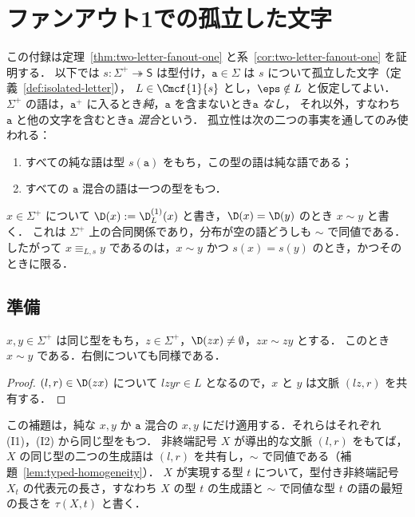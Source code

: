 \section{ファンアウト1での孤立した文字}
\label{app:two-letter-fanout-one}

この付録は定理~\ref{thm:two-letter-fanout-one} と系~\ref{cor:two-letter-fanout-one} を証明する．
以下では $s:\Sigma^+\twoheadrightarrow\mathsf S$ は型付け，$\mathtt a\in\Sigma$ は $s$ について孤立した文字（定義~\ref{def:isolated-letter}），
$L\in\Cmcf{1}{s}$ とし，$\eps\notin L$ と仮定してよい．
$\Sigma^+$ の語は，$\mathtt a^+$ に入るとき\emph{純}，$\mathtt a$ を含まないとき\emph{$\mathtt a$ なし}，
それ以外，すなわち $\mathtt a$ と他の文字を含むとき\emph{$\mathtt a$ 混合}という．
孤立性は次の二つの事実を通してのみ使われる：
\begin{enumerate}[label=\textup{(I\arabic*)},leftmargin=*]
\item すべての純な語は型 $s(\mathtt a)$ をもち，この型の語は純な語である；
\item すべての $\mathtt a$ 混合の語は一つの型をもつ．
\end{enumerate}
$x\in\Sigma^+$ について $\D(x):=\D^{(1)}_L(x)$ と書き，$\D(x)=\D(y)$ のとき $x\sim y$ と書く．
これは $\Sigma^+$ 上の合同関係であり，分布が空の語どうしも $\sim$ で同値である．
したがって $x\equiv_{L,s}y$ であるのは，$x\sim y$ かつ $s(x)=s(y)$ のとき，かつそのときに限る．

\subsection{準備}

\begin{lemma}[消去]
\label{lem:app-h-cancel}
$x,y\in\Sigma^+$ は同じ型をもち，$z\in\Sigma^+$，$\D(zx)\ne\emptyset$，$zx\sim zy$ とする．
このとき $x\sim y$ である．右側についても同様である．
\end{lemma}

\begin{proof}
$(l,r)\in\D(zx)$ について $lzyr\in L$ となるので，$x$ と $y$ は文脈 $(lz,r)$ を共有する．
\end{proof}

この補題は，純な $x,y$ か $\mathtt a$ 混合の $x,y$ にだけ適用する．それらはそれぞれ (I1)，(I2) から同じ型をもつ．
非終端記号 $X$ が導出的な文脈 $(l,r)$ をもてば，$X$ の同じ型の二つの生成語は $(l,r)$ を共有し，$\sim$ で同値である（補題~\ref{lem:typed-homogeneity}）．
$X$ が実現する型 $t$ について，型付き非終端記号 $X_t$ の代表元の長さ，すなわち $X$ の型 $t$ の生成語と $\sim$ で同値な型 $t$ の語の最短の長さを $\tau(X,t)$ と書く．

